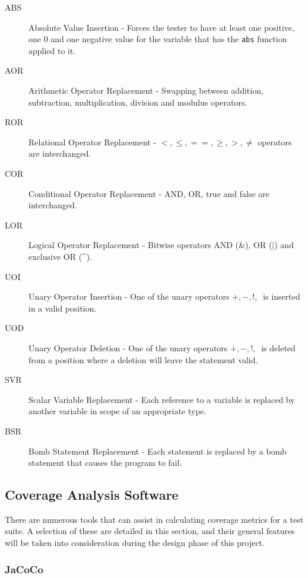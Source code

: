 \begin{description}
\item[ABS] Absolute Value Insertion - Forces the tester to have at least one positive, one 0 and one negative value for the variable that has the \verb+abs+ function applied to it.
\item[AOR] Arithmetic Operator Replacement - Swapping between addition, subtraction, multiplication, division and modulus operators.
\item[ROR] Relational Operator Replacement - $<, \leq, ==, \geq, >, \neq$ operators are interchanged.
\item[COR] Conditional Operator Replacement - AND, OR, true and false are interchanged.
\item[LOR] Logical Operator Replacement - Bitwise operators AND (\&), OR ($\mid$) and exclusive OR (\^{}).
\item[UOI] Unary Operator Insertion - One of the unary operators $+, -, !, ~ $ is inserted in a valid position.
\item[UOD] Unary Operator Deletion - One of the unary operators $+, -, !, ~ $ is deleted from a position where a deletion will leave the statement valid.
\item[SVR] Scalar Variable Replacement - Each reference to a variable is replaced by another variable in scope of an appropriate type.
\item[BSR] Bomb Statement Replacement - Each statement is replaced by a bomb statement that causes the program to fail.
\end{description}

\subsection{Coverage Analysis Software}

There are numerous tools that can assist in calculating coverage metrics for a test suite. A selection of these are detailed in this section, and their general features will be taken into consideration during the design phase of this project.

\subsubsection{JaCoCo}


